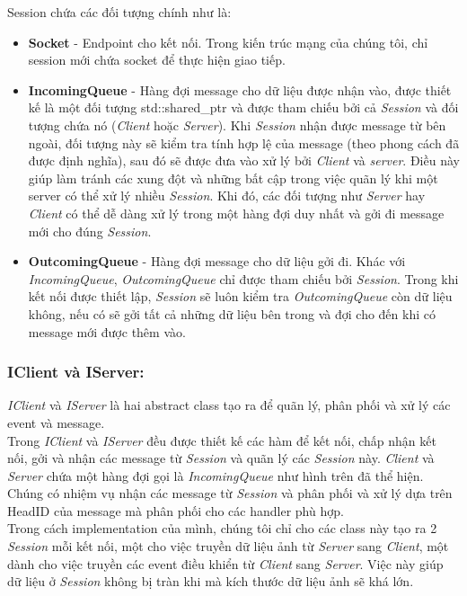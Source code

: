 Session chứa các đối tượng chính như là: 
\begin{itemize}
	\item \textbf{Socket} - Endpoint cho kết nối. Trong kiến trúc mạng của chúng tôi, chỉ session mới chứa socket để thực hiện giao tiếp.
	\item \textbf{IncomingQueue} - Hàng đợi message cho dữ liệu được nhận vào, được thiết kế là một đối tượng std::shared\_ptr và được tham chiếu bởi cả \textit{Session} và đối tượng chứa nó (\textit{Client} hoặc \textit{Server}). Khi \textit{Session} nhận được message từ bên ngoài, đối tượng này sẽ kiểm tra tính hợp lệ của message (theo phong cách đã được định nghĩa), sau đó sẽ được đưa vào xử lý bởi \textit{Client} và \textit{server}. Điều này giúp làm tránh các xung đột và những bất cập trong việc quãn lý khi một server có thể xử lý nhiều \textit{Session}. Khi đó, các đối tượng như \textit{Server} hay \textit{Client} có thể dễ dàng xử lý trong một hàng đợi duy nhất và gởi đi message mới cho đúng \textit{Session}.
	\item \textbf{OutcomingQueue} - Hàng đợi message cho dữ liệu gởi đi. Khác với \textit{IncomingQueue}, \textit{OutcomingQueue} chỉ được tham chiếu bởi \textit{Session}. Trong khi kết nối được thiết lập, \textit{Session} sẽ luôn kiểm tra \textit{OutcomingQueue} còn dữ liệu không, nếu có sẽ gởi tất cả những dữ liệu bên trong và đợi cho đến khi có message mới được thêm vào.
\end{itemize}

\subsubsection{IClient và IServer: }
\textit{IClient} và \textit{IServer} là hai abstract class tạo ra để quãn lý, phân phối và xử lý các event và message.  \\
Trong \textit{IClient} và \textit{IServer} đều được thiết kế các hàm để kết nối, chấp nhận kết nối, gởi và nhận các message từ \textit{Session} và quãn lý các \textit{Session} này. \textit{Client} và \textit{Server} chứa một hàng đợi gọi là \textit{IncomingQueue} như hình trên đã thể hiện. Chúng có nhiệm vụ nhận các message từ \textit{Session} và phân phối và xử lý dựa trên HeadID của message mà phân phối cho các handler phù hợp. \\
Trong cách implementation của mình, chúng tôi chỉ cho các class này tạo ra 2 \textit{Session} mỗi kết nối, một cho việc truyền dữ liệu ảnh từ \textit{Server} sang \textit{Client}, một dành cho việc truyền các event điều khiển từ \textit{Client} sang \textit{Server}. Việc này giúp dữ liệu ở \textit{Session} không bị tràn khi mà kích thước dữ liệu ảnh sẽ khá lớn. 


